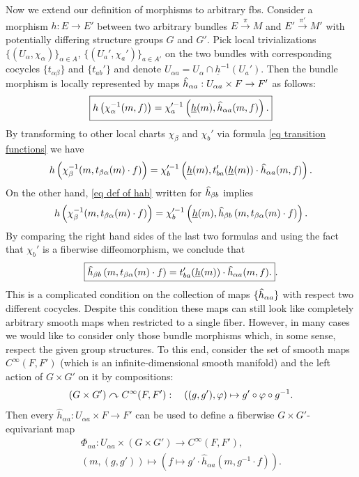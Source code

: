 Now we extend our definition of morphisms to arbitrary \glspl{fb}. Consider a morphism $h:E\to E'$ between two arbitrary bundles $E\overset{\pi}{\to}M$ and $E'\overset{\pi'}{\to}M'$ with potentially differing structure groups $G$ and $G'$. Pick local trivializations $\{(U_\alpha,\chi_\alpha)\}_{\alpha\in A}$, $\{(U_a',\chi_a')\}_{a\in A'}$ on the two bundles with corresponding cocycles $\{t_{\alpha\beta}\}$ and $\{t_{ab}'\}$ and denote $U_{\alpha a}=U_\alpha\cap \underline{h}^{-1}(U_a')$. Then the bundle morphism is locally represented by maps
$\wh{h}_{\alpha a}:U_{\alpha a}\times F\to F'$ as follows: 
\[\boxed{h\left(\chi_\alpha^{-1}(m,f)\right)=\chi_a^{\prime-1}\left(\underline{h}(m),\wh{h}_{\alpha a}(m,f)\right).}\label{eq def of hab}\]
By transforming to other local charts $\chi_\beta$ and $\chi_b'$ via formula \eqref{eq transition functions} we have
\[h\left(\chi_\beta^{-1}(m,t_{\beta\alpha}(m)\cdot f)\right)=\chi_b^{\prime-1}\left(\underline{h}(m),t_{ba}'(\underline{h}(m))\cdot\wh{h}_{\alpha a}(m,f)\right).\]
On the other hand, \eqref{eq def of hab} written for $\wh{h}_{\beta b}$ implies
\[h\left(\chi_\beta^{-1}(m,t_{\beta\alpha}(m)\cdot f)\right)=\chi_b^{\prime-1}\left(\underline{h}(m),\wh{h}_{\beta b}\left(m,t_{\beta\alpha}(m)\cdot f\right)\right).\]
By comparing the right hand sides of the last two formulas and using the fact that $\chi_b'$ is a fiberwise diffeomorphism, we conclude that
\[\boxed{\wh{h}_{\beta b}\left(m,t_{\beta\alpha}(m)\cdot f\right)=t_{ba}'(\underline{h}(m))\cdot \wh{h}_{\alpha a}(m,f).}\label{eq transformation of hab}.\]
This is a complicated condition on the collection of maps $\{\wh{h}_{\alpha a}\}$ with respect two different cocycles. Despite this condition these maps can still look like completely arbitrary smooth maps when restricted to a single fiber. However, in many cases we would like to consider only those bundle morphisms which, in some sense, respect the given group structures. To this end, consider the set of smooth maps $C^\infty(F,F')$ (which is an infinite-dimensional smooth manifold) and the left action of $G\times G'$ on it by compositions:
\[(G\times G')\curvearrowright C^\infty(F,F'):\quad ((g,g'),\varphi)\mapsto g'\circ \varphi\circ g^{-1}.\]
Then every $\hat{h}_{\alpha a}:U_{\alpha a}\times F\to F'$ can be used to define a fiberwise $G\times G'$-equivariant map
\begin{gather}
    \Phi_{\alpha a}: U_{\alpha a}\times (G\times G')\to C^\infty(F,F'),\\
    (m,(g,g'))\mapsto \left(f\mapsto g'\cdot \hat{h}_{\alpha a}\left(m,g^{-1}\cdot f\right)\right).\label{def Phiab}
\end{gather}
